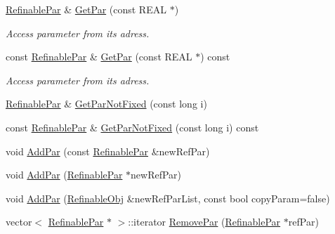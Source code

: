 \begin{DoxyCompactItemize}
\mbox{\hyperlink{class_obj_cryst_1_1_refinable_par}{Refinable\+Par}} \& \mbox{\hyperlink{class_obj_cryst_1_1_refinable_obj_aa14be76083155570661aa30e9e995dda}{Get\+Par}} (const R\+E\+AL $\ast$)
\begin{DoxyCompactList}\small\item\em Access parameter from its adress. \end{DoxyCompactList}\item 
\mbox{\label{class_obj_cryst_1_1_refinable_obj_a749436c43ab08a77c3ee11f7b53d7a15}} 
const \mbox{\hyperlink{class_obj_cryst_1_1_refinable_par}{Refinable\+Par}} \& \mbox{\hyperlink{class_obj_cryst_1_1_refinable_obj_a749436c43ab08a77c3ee11f7b53d7a15}{Get\+Par}} (const R\+E\+AL $\ast$) const
\begin{DoxyCompactList}\small\item\em Access parameter from its adress. \end{DoxyCompactList}\item 
\mbox{\hyperlink{class_obj_cryst_1_1_refinable_par}{Refinable\+Par}} \& \mbox{\hyperlink{class_obj_cryst_1_1_refinable_obj_a77a4f8d1b3b1184ac92b1a4b55a7f77a}{Get\+Par\+Not\+Fixed}} (const long i)
\item 
const \mbox{\hyperlink{class_obj_cryst_1_1_refinable_par}{Refinable\+Par}} \& \mbox{\hyperlink{class_obj_cryst_1_1_refinable_obj_af3e09ef3992170784583869922df4735}{Get\+Par\+Not\+Fixed}} (const long i) const
\item 
void \mbox{\hyperlink{class_obj_cryst_1_1_refinable_obj_a0c0050a3d3141ca34eb8f4b559ad2f8d}{Add\+Par}} (const \mbox{\hyperlink{class_obj_cryst_1_1_refinable_par}{Refinable\+Par}} \&new\+Ref\+Par)
\item 
void \mbox{\hyperlink{class_obj_cryst_1_1_refinable_obj_a4a792c84f7d35e71b3e89aae5a87bffa}{Add\+Par}} (\mbox{\hyperlink{class_obj_cryst_1_1_refinable_par}{Refinable\+Par}} $\ast$new\+Ref\+Par)
\item 
void \mbox{\hyperlink{class_obj_cryst_1_1_refinable_obj_a6a28259e473fadd53fbc9b9bf7930813}{Add\+Par}} (\mbox{\hyperlink{class_obj_cryst_1_1_refinable_obj}{Refinable\+Obj}} \&new\+Ref\+Par\+List, const bool copy\+Param=false)
\item 
vector$<$ \mbox{\hyperlink{class_obj_cryst_1_1_refinable_par}{Refinable\+Par}} $\ast$ $>$\+::iterator \mbox{\hyperlink{class_obj_cryst_1_1_refinable_obj_a2a46afb65cf67e18ee8d0e0aeddbf1a4}{Remove\+Par}} (\mbox{\hyperlink{class_obj_cryst_1_1_refinable_par}{Refinable\+Par}} $\ast$ref\+Par)

\end{DoxyCompactItemize}
